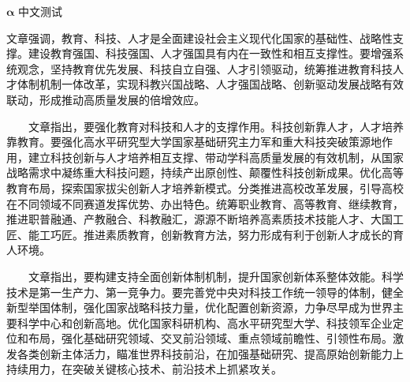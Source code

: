 

$\symbf{\alpha}$ 中文测试

文章强调，教育、科技、人才是全面建设社会主义现代化国家的基础性、战略性支撑。建设教育强国、科技强国、人才强国具有内在一致性和相互支撑性。要增强系统观念，坚持教育优先发展、科技自立自强、人才引领驱动，统筹推进教育科技人才体制机制一体改革，实现科教兴国战略、人才强国战略、创新驱动发展战略有效联动，形成推动高质量发展的倍增效应。

　　文章指出，要强化教育对科技和人才的支撑作用。科技创新靠人才，人才培养靠教育。要强化高水平研究型大学国家基础研究主力军和重大科技突破策源地作用，建立科技创新与人才培养相互支撑、带动学科高质量发展的有效机制，从国家战略需求中凝练重大科技问题，持续产出原创性、颠覆性科技创新成果。优化高等教育布局，探索国家拔尖创新人才培养新模式。分类推进高校改革发展，引导高校在不同领域不同赛道发挥优势、办出特色。统筹职业教育、高等教育、继续教育，推进职普融通、产教融合、科教融汇，源源不断培养高素质技术技能人才、大国工匠、能工巧匠。推进素质教育，创新教育方法，努力形成有利于创新人才成长的育人环境。

　　文章指出，要构建支持全面创新体制机制，提升国家创新体系整体效能。科学技术是第一生产力、第一竞争力。要完善党中央对科技工作统一领导的体制，健全新型举国体制，强化国家战略科技力量，优化配置创新资源，力争尽早成为世界主要科学中心和创新高地。优化国家科研机构、高水平研究型大学、科技领军企业定位和布局，强化基础研究领域、交叉前沿领域、重点领域前瞻性、引领性布局。激发各类创新主体活力，瞄准世界科技前沿，在加强基础研究、提高原始创新能力上持续用力，在突破关键核心技术、前沿技术上抓紧攻关。
